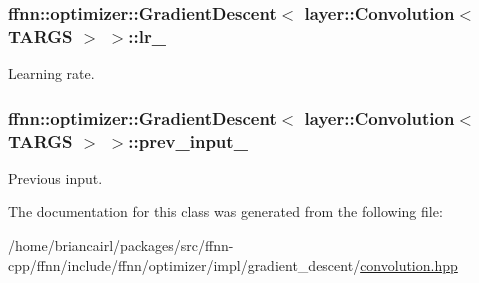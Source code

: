 \hypertarget{classffnn_1_1optimizer_1_1_gradient_descent_3_01layer_1_1_convolution_3_01_t_a_r_g_s_01_4_01_4_a054941817564001aa5d455a9fe41262e}{
\subsubsection[{lr\-\_\-}]{ {\bf ffnn\-::optimizer\-::\-Gradient\-Descent}$<$ {\bf layer\-::\-Convolution}$<$ {\bf T\-A\-R\-G\-S} $>$ $>$\-::lr\-\_\-\hspace{0.3cm}{\ttfamily [protected]}}}\label{classffnn_1_1optimizer_1_1_gradient_descent_3_01layer_1_1_convolution_3_01_t_a_r_g_s_01_4_01_4_a054941817564001aa5d455a9fe41262e}


Learning rate. 

\hypertarget{classffnn_1_1optimizer_1_1_gradient_descent_3_01layer_1_1_convolution_3_01_t_a_r_g_s_01_4_01_4_afb2c039078e26446400314336dc24482}{
\subsubsection[{prev\-\_\-input\-\_\-}]{ {\bf ffnn\-::optimizer\-::\-Gradient\-Descent}$<$ {\bf layer\-::\-Convolution}$<$ {\bf T\-A\-R\-G\-S} $>$ $>$\-::prev\-\_\-input\-\_\-\hspace{0.3cm}{\ttfamily [protected]}}}\label{classffnn_1_1optimizer_1_1_gradient_descent_3_01layer_1_1_convolution_3_01_t_a_r_g_s_01_4_01_4_afb2c039078e26446400314336dc24482}


Previous input. 



The documentation for this class was generated from the following file\-:\begin{DoxyCompactItemize}
\item 
/home/briancairl/packages/src/ffnn-\/cpp/ffnn/include/ffnn/optimizer/impl/gradient\-\_\-descent/\hyperlink{optimizer_2impl_2gradient__descent_2convolution_8hpp}{convolution.\-hpp}\end{DoxyCompactItemize}

